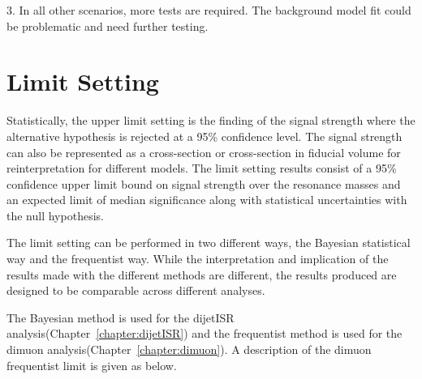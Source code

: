     3. In all other scenarios, more tests are required. The background model fit could be problematic and need further testing.  

\section{Limit Setting}
\label{sec:limits}


Statistically, the upper limit setting is the finding of the signal strength where the alternative hypothesis is rejected at a 95\% confidence level. The signal strength can also be represented as a cross-section or cross-section in fiducial volume for reinterpretation for different models. 
The limit setting results consist of a 95\% confidence upper limit bound on signal strength over the resonance masses and an expected limit of median significance along with statistical uncertainties with the null hypothesis. 

The limit setting can be performed in two different ways, the Bayesian statistical way and the frequentist way. While the interpretation and implication of the results made with the different methods are different, the results produced are designed to be comparable across different analyses. 

The Bayesian method is used for the dijetISR analysis(Chapter~\ref{chapter:dijetISR}) and the frequentist method is used for the dimuon analysis(Chapter~\ref{chapter:dimuon}). A description of the dimuon frequentist limit is given as below. 

%

